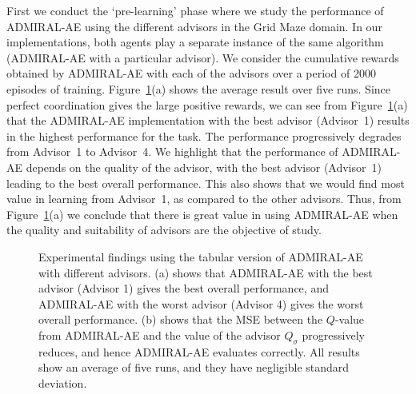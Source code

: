 \documentclass[jair, twoside,11pt,theapa]{article}
\begin{document}
First we conduct the `pre-learning' phase where we study the performance of ADMIRAL-AE using the different advisors in the Grid Maze domain. In our implementations, both agents play a separate instance of the same algorithm (ADMIRAL-AE with a particular advisor). We consider the cumulative rewards obtained by ADMIRAL-AE with each of the advisors over a period of 2000 episodes of training.  Figure~\ref{fig:gridworld}(a) shows the average result over five runs.  Since perfect coordination gives the large positive rewards, we can see from Figure~\ref{fig:gridworld}(a) that the ADMIRAL-AE implementation with the best advisor (Advisor~1) results in the  highest performance for the task. The performance progressively degrades from Advisor~1 to Advisor~4. We highlight that the performance of ADMIRAL-AE depends on the quality of the advisor, with the best advisor (Advisor~1) leading to the best overall performance. This also shows that we would find most value in learning from Advisor~1, as compared to the other advisors. Thus, from Figure~\ref{fig:gridworld}(a) we conclude that there is great value in using ADMIRAL-AE when the quality and suitability of advisors are the objective of study. 



\begin{figure}

	\centering
	\quad
  \caption{Experimental findings using the tabular version of ADMIRAL-AE with different advisors. (a) shows that ADMIRAL-AE with the best advisor (Advisor 1) gives the best overall performance, and ADMIRAL-AE with the worst advisor (Advisor 4) gives the worst overall performance. (b) shows that the MSE between the $Q$-value from ADMIRAL-AE and the value of the advisor $Q_\sigma$ progressively reduces, and hence ADMIRAL-AE evaluates correctly. All results show an average of five runs, and they have negligible standard deviation.}%
	\label{fig:gridworld}
\end{figure}
\end{document}
